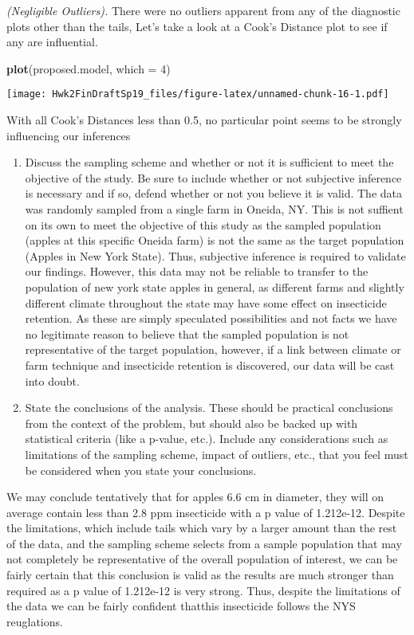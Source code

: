 \documentclass[12pt,]{article}
\newenvironment{Shaded}{\begin{snugshade}}{\end{snugshade}}
\newcommand{\KeywordTok}[1]{\textcolor[rgb]{0.13,0.29,0.53}{\textbf{#1}}}
\newcommand{\DataTypeTok}[1]{\textcolor[rgb]{0.13,0.29,0.53}{#1}}
\newcommand{\DecValTok}[1]{\textcolor[rgb]{0.00,0.00,0.81}{#1}}
\newcommand{\NormalTok}[1]{#1}
\begin{document}
\emph{(Negligible Outliers).} There were no outliers apparent from any
of the diagnostic plots other than the tails, Let's take a look at a
Cook's Distance plot to see if any are influential.

\begin{Shaded}
\begin{Highlighting}[]
\KeywordTok{plot}\NormalTok{(proposed.model, }\DataTypeTok{which =} \DecValTok{4}\NormalTok{)}
\end{Highlighting}
\end{Shaded}

\texttt{[image: Hwk2FinDraftSp19\_files/figure-latex/unnamed-chunk-16-1.pdf]}

With all Cook's Distances less than 0.5, no particular point seems to be
strongly influencing our inferences

\begin{enumerate}
\def\labelenumi{\alph{enumi})}
\setcounter{enumi}{4}
\item
  Discuss the sampling scheme and whether or not it is sufficient to
  meet the objective of the study. Be sure to include whether or not
  subjective inference is necessary and if so, defend whether or not you
  believe it is valid. The data was randomly sampled from a single farm
  in Oneida, NY. This is not suffient on its own to meet the objective
  of this study as the sampled population (apples at this specific
  Oneida farm) is not the same as the target population (Apples in New
  York State). Thus, subjective inference is required to validate our
  findings. However, this data may not be reliable to transfer to the
  population of new york state apples in general, as different farms and
  slightly different climate throughout the state may have some effect
  on insecticide retention. As these are simply speculated possibilities
  and not facts we have no legitimate reason to believe that the sampled
  population is not representative of the target population, however, if
  a link between climate or farm technique and insecticide retention is
  discovered, our data will be cast into doubt.
\item
  State the conclusions of the analysis. These should be practical
  conclusions from the context of the problem, but should also be backed
  up with statistical criteria (like a p-value, etc.). Include any
  considerations such as limitations of the sampling scheme, impact of
  outliers, etc., that you feel must be considered when you state your
  conclusions.
\end{enumerate}

We may conclude tentatively that for apples 6.6 cm in diameter, they
will on average contain less than 2.8 ppm insecticide with a p value of
1.212e-12. Despite the limitations, which include tails which vary by a
larger amount than the rest of the data, and the sampling scheme selects
from a sample population that may not completely be representative of
the overall population of interest, we can be fairly certain that this
conclusion is valid as the results are much stronger than required as a
p value of 1.212e-12 is very strong. Thus, despite the limitations of
the data we can be fairly confident thatthis insecticide follows the NYS
reuglations.
\end{document}
